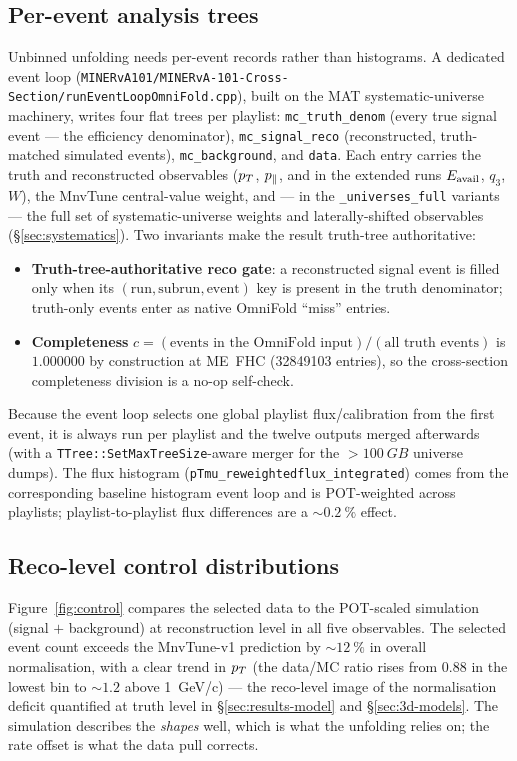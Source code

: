 \subsection{Per-event analysis trees}
\label{sec:evloop}
Unbinned unfolding needs per-event records rather than histograms. A dedicated
event loop
(\texttt{MINERvA101/MINERvA-101-Cross-Section/runEventLoopOmniFold.cpp}),
built on the MAT systematic-universe machinery, writes four flat trees per
playlist: \texttt{mc\_truth\_denom} (every true signal event --- the
efficiency denominator), \texttt{mc\_signal\_reco} (reconstructed,
truth-matched simulated events), \texttt{mc\_background}, and \texttt{data}.
Each entry carries the truth and reconstructed observables
($p_{T}$, $p_{\parallel}$, and in the extended runs $E_{\mathrm{avail}}$, $q_{3}$, $W$), the
MnvTune central-value weight, and --- in the \texttt{\_universes\_full}
variants --- the full set of systematic-universe weights and
laterally-shifted observables (\S\ref{sec:systematics}). Two invariants make
the result truth-tree authoritative:
\begin{itemize}
  \item \textbf{Truth-tree-authoritative reco gate}: a reconstructed signal
        event is filled only when its
        $(\mathrm{run},\mathrm{subrun},\mathrm{event})$ key is present in the
        truth denominator; truth-only events enter as native OmniFold
        ``miss'' entries.
  \item \textbf{Completeness} $c = (\text{events in the OmniFold
        input})/(\text{all truth events})$ is $1.000000$ by construction at
        ME~FHC (\num{32849103} entries), so the cross-section completeness
        division is a no-op self-check.
\end{itemize}
Because the event loop selects one global playlist flux/calibration from the
first event, it is always run per playlist and the twelve outputs merged
afterwards (with a \texttt{TTree::SetMaxTreeSize}-aware merger for the
$>\SI{100}{GB}$ universe dumps). The flux histogram
(\texttt{pTmu\_reweightedflux\_integrated}) comes from the corresponding
baseline histogram event loop and is POT-weighted across playlists;
playlist-to-playlist flux differences are a $\sim\SI{0.2}{\percent}$ effect.

\subsection{Reco-level control distributions}
\label{sec:controlplots}
Figure~\ref{fig:control} compares the selected data to the POT-scaled
simulation (signal $+$ background) at reconstruction level in all five
observables. The selected event count exceeds the MnvTune-v1 prediction by
$\sim\SI{12}{\percent}$ in overall normalisation, with a clear trend in
$p_{T}$ (the data/MC ratio rises from $0.88$ in the lowest bin
to $\sim1.2$ above \SI{1}{GeV/c}) --- the reco-level image of the
normalisation deficit quantified at truth level in
\S\ref{sec:results-model} and \S\ref{sec:3d-models}. The simulation
describes the \emph{shapes} well, which is what the unfolding relies on; the
rate offset is what the data pull corrects.

